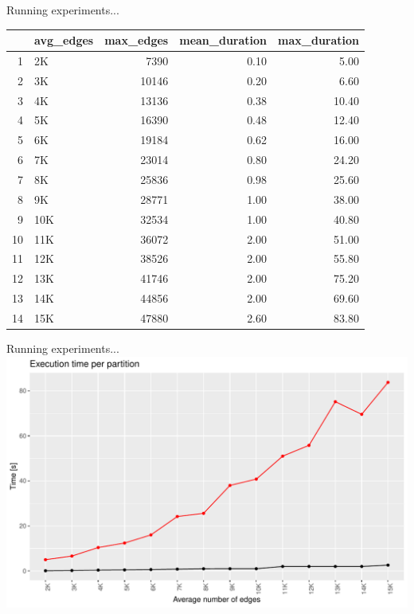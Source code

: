 \documentclass{beamer}
\begin{document}
\begin{frame}{Running experiments...}
    \centering 
    \begin{table}[ht]
    \centering
    \begin{tabular}{rlrrr}
    \hline
    & avg\_edges & max\_edges & mean\_duration & max\_duration \\ 
    \hline
    1 & 2K & 7390 & 0.10 & 5.00 \\ 
    2 & 3K & 10146 & 0.20 & 6.60 \\ 
    3 & 4K & 13136 & 0.38 & 10.40 \\ 
    4 & 5K & 16390 & 0.48 & 12.40 \\ 
    5 & 6K & 19184 & 0.62 & 16.00 \\ 
    6 & 7K & 23014 & 0.80 & 24.20 \\ 
    7 & 8K & 25836 & 0.98 & 25.60 \\ 
    8 & 9K & 28771 & 1.00 & 38.00 \\ 
    9 & 10K & 32534 & 1.00 & 40.80 \\ 
    10 & 11K & 36072 & 2.00 & 51.00 \\ 
    11 & 12K & 38526 & 2.00 & 55.80 \\ 
    12 & 13K & 41746 & 2.00 & 75.20 \\ 
    13 & 14K & 44856 & 2.00 & 69.60 \\ 
    14 & 15K & 47880 & 2.60 & 83.80 \\ 
    \hline
    \end{tabular}
    \end{table}   
\end{frame}

\begin{frame}{Running experiments...}
    \centering 
    \includegraphics[width=1\textwidth]{figures/Run}
\end{frame}
\end{document}
